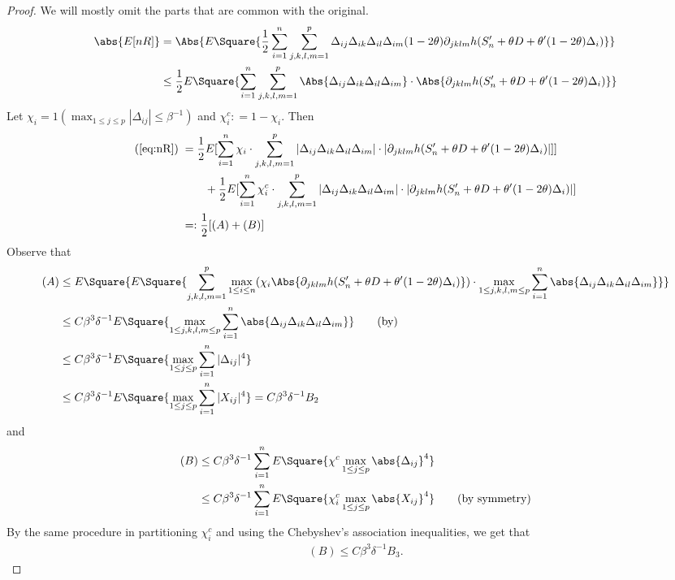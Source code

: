 \documentclass[uplatex,dvipdfmx]{jsarticle}
\begin{document}
\begin{proof}
     We will mostly omit the parts that are common with the original.
    \begin{align}\label{eq:nR}
        \abs{E[ nR ]} &= \Abs{ E \Square{ \frac{1}{2} \sum_{i=1}^n  \sum_{j,k,l,m=1}^p \Delta_{ij} \Delta_{ik} \Delta_{il} \Delta_{im} ( 1 - 2 \theta )  \partial_{ jklm} h ( S_n' + \theta D +  \theta  ' ( 1 - 2 \theta) \Delta_i )}} \\
        &\leq  \frac{1}{2} E \Square{  \sum_{i=1}^n  \sum_{j,k,l,m=1}^p \Abs{\Delta_{ij} \Delta_{ik} \Delta_{il} \Delta_{im}} \cdot \Abs{\partial_{ jklm} h ( S_n' + \theta D +  \theta  ' ( 1 - 2 \theta) \Delta_i )}}
    \end{align}
        Let $\chi_i = 1( \max_{1 \leq j \leq p} | \Delta_{ij} | \leq \beta^{-1})  $ and $ \chi_i^c : = 1 - \chi_i $. Then
        \begin{align*}
            (\ref{eq:nR}) \;&= \frac{1}{2}E[ \sum_{i=1}^n \chi_i \cdot    \sum_{j,k,l,m=1}^p |\Delta_{ij} \Delta_{ik} \Delta_{il} \Delta_{im} | \cdot | \partial_{ jklm} h ( S_n' + \theta D +  \theta  ' ( 1 - 2 \theta) \Delta_i )| ]]\\
            &\qquad+ \frac{ 1}{2} E [ \sum_{i=1}^n \chi_i^c \cdot   \sum_{j,k,l,m=1}^p |\Delta_{ij} \Delta_{ik} \Delta_{il} \Delta_{im} | \cdot | \partial_{ jklm} h ( S_n' + \theta D +  \theta  ' ( 1 - 2 \theta) \Delta_i )| ]\\
            &=: \frac{1}{2} [ (A)+ (B)]
        \end{align*}
        Observe that 
        \begin{align*}
            (A)&\leq E\Square{ E \Square{   \sum_{j,k,l,m=1}^p  \max_{1 \leq i \leq n }( \chi_i \Abs{ \partial_{ jklm} h ( S_n' + \theta D +  \theta  ' ( 1 - 2 \theta) \Delta_i ) })\cdot\max_{ 1\leq j,k,l,m \leq p}\sum_{i=1}^n \abs{\Delta_{ij} \Delta_{ik} \Delta_{il} \Delta_{im}} }}\\
            &\leq C \beta ^3 \delta ^{-1} E\Square{ \max_{ 1 \leq j , k,l,m\leq p}\sum_{i=1}^n \abs{\Delta_{ij} \Delta_{ik} \Delta_{il} \Delta_{im}} }  \qquad( \text{by} )\\
            &\leq C \beta ^3 \delta ^{-1} E \Square{ \max _{ 1 \leq j \leq p } \sum_{i=1}^n | \Delta_{ij}|^4} \\
            &\leq C \beta ^3 \delta ^{-1} E\Square{ \max _{ 1 \leq j \leq p } \sum_{i=1}^n | X_{ij}|^4} = C \beta ^3 \delta ^{-1} B_2
        \end{align*}
    and
    \begin{align*}
        (B)&\leq C \beta^3 \delta^{-1} \sum _{i=1}^n E\Square{ \chi^c  \max_{1 \leq j \leq p} \abs{\Delta_{ij}}^4} \\
        &\leq C \beta^3 \delta^{-1} \sum_{i=1}^n E\Square{ \chi_i^c \max_{ 1 \leq j \leq p} \abs{X_{ij}}^4}\qquad(\text{by symmetry})
    \end{align*}
    By the same procedure in \cite{chernozhukov2014gaussian} partitioning $\chi_i^c$ and using the Chebyshev's association inequalities, we get that 
    \begin{align*}
        (B) \leq C \beta^3 \delta^{-1} B_3.
    \end{align*}
    

\end{proof}
\end{document}
